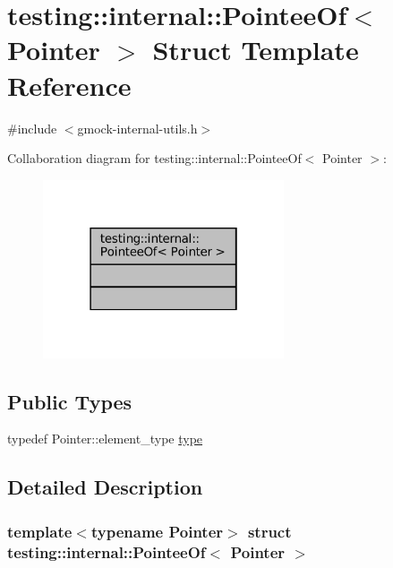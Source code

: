 \hypertarget{structtesting_1_1internal_1_1PointeeOf}{}\section{testing\+:\+:internal\+:\+:Pointee\+Of$<$ Pointer $>$ Struct Template Reference}
\label{structtesting_1_1internal_1_1PointeeOf}


{\ttfamily \#include $<$gmock-\/internal-\/utils.\+h$>$}



Collaboration diagram for testing\+:\+:internal\+:\+:Pointee\+Of$<$ Pointer $>$\+:
\nopagebreak
\begin{figure}[H]
\begin{center}
\leavevmode
\includegraphics[width=202pt]{structtesting_1_1internal_1_1PointeeOf__coll__graph}
\end{center}
\end{figure}
\subsection*{Public Types}
\begin{DoxyCompactItemize}
\item 
typedef Pointer\+::element\+\_\+type \hyperlink{structtesting_1_1internal_1_1PointeeOf_aca4d92c8f978e47a8695e82cffc11837}{type}
\end{DoxyCompactItemize}


\subsection{Detailed Description}
\subsubsection*{template$<$typename Pointer$>$\newline
struct testing\+::internal\+::\+Pointee\+Of$<$ Pointer $>$}



